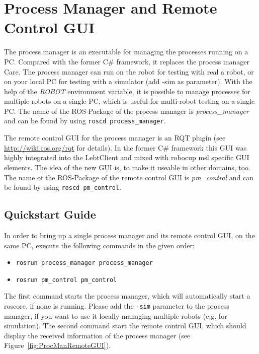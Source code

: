 \chapter{Process Manager and Remote Control GUI}
\label{chap:ProcMan}

The process manager is an executable for managing the processes running on a PC. Compared with the former C\# framework, it replaces the process manager Care. The process manager can run on the robot for testing with real a robot, or on your local PC for testing with a simulator (add -sim as parameter). With the help of the \emph{ROBOT} environment variable, it is possible to manage processes for multiple robots on a single PC, which is useful for multi-robot testing on a single PC. The name of the ROS-Package of the process manager is \emph{process\_manager} and can be found by using \verb#roscd process_manager#.

The remote control GUI for the process manager is an RQT plugin (see \url{http://wiki.ros.org/rqt} for details). In the former C\# framework this GUI was highly integrated into the LebtClient and mixed with robocup msl specific GUI elements. The idea of the new GUI is, to make it useable in other domains, too. The name of the ROS-Package of the remote control GUI is \emph{pm\_control} and can be found by using \verb#roscd pm_control#.

\section{Quickstart Guide}
\label{sec:ProcManQuickstart}

In order to bring up a single process manager and its remote control GUI, on the same PC, execute the following commands in the given order:
\begin{itemize}
 \item \verb#rosrun process_manager process_manager#
 \item \verb#rosrun pm_control pm_control#
\end{itemize}

The first command starts the process manager, which will automatically start a roscore, if none is running. Please add the \verb#-sim# parameter to the process manager, if you want to use it locally managing multiple robots (e.g. for simulation). The second command start the remote control GUI, which should display the received information of the process manager (see Figure~\ref{fig:ProcManRemoteGUI}). 

